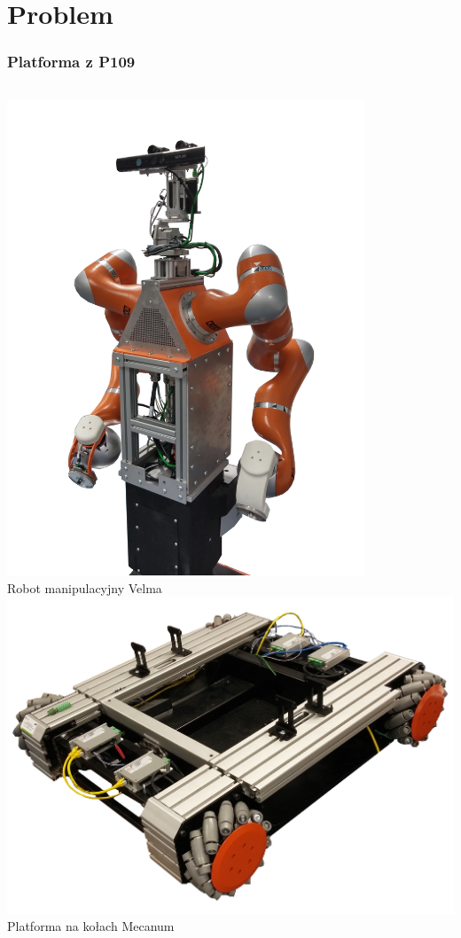 \documentclass{beamer}
\begin{document}
	\section{Problem}
	\begin{frame}
		\frametitle{Platforma z P109}
		\begin{columns}[c]
			\centering
			\includegraphics[width=0.8\textwidth]{graphics/velma.png} \\
			Robot manipulacyjny Velma
			\centering
			\includegraphics[width=\textwidth]{graphics/omnivelma.png} \\
			Platforma na kołach Mecanum
		\end{columns}
	\end{frame}
\end{document}
